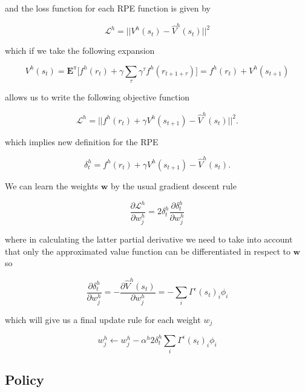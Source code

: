 \documentclass{article}
\begin{document}
and the loss function for each RPE function is given by

\begin{equation}
  \mathcal{L}^h = ||V^h(s_t) - \hat{V}^h(s_t)||^2
\end{equation}

which if we take the following expansion

\begin{equation}
  V^h(s_t) = \mathbf{E}^\pi \big[ f^h(r_{t}) + \gamma \sum_{\tau} \gamma^{\tau} f^h(r_{t+1+\tau})\big ] = f^h(r_t) + V^h(s_{t+1})
\end{equation}

allows us to write the following objective function

\begin{equation}
  \mathcal{L}^h = ||f^h(r_t) + \gamma V^h(s_{t+1}) - \hat{V}^h(s_t)||^2.
\end{equation}

which implies new definition for the RPE 

\begin{equation}
  \delta^h_t = f^h(r_t) + \gamma V^h(s_{t+1})-\hat{V}^h(s_t).
\end{equation}

We can learn the weights $\mathbf{w}$ by the usual gradient descent rule

\begin{equation}
  \frac{\partial \mathcal{L}^h}{\partial w^h_j} = 2 \delta^h_t\frac{\partial \delta^h_t}{\partial w^h_j}
\end{equation}

where in calculating the latter partial derivative we need to take into account that only the approximated 
value function can be differentiated in respect to $\mathbf{w}$ so

\begin{equation}
  \frac{\partial \delta^h_t}{\partial w^h_j} = - \frac{\partial \hat{V}^h(s_{t})}{\partial w^h_j} =   -\sum_{i} \Gamma^\epsilon(s_t)_i\phi_i
\end{equation}

which will give us a final update rule for each weight $w_j$ 

\begin{equation}
  w^h_j \leftarrow w^h_j - \alpha^h 2 \delta^h_t\sum_{i}\Gamma^\epsilon(s_t)_i\phi_i
\end{equation}

\subsection{Policy}
\end{document}
